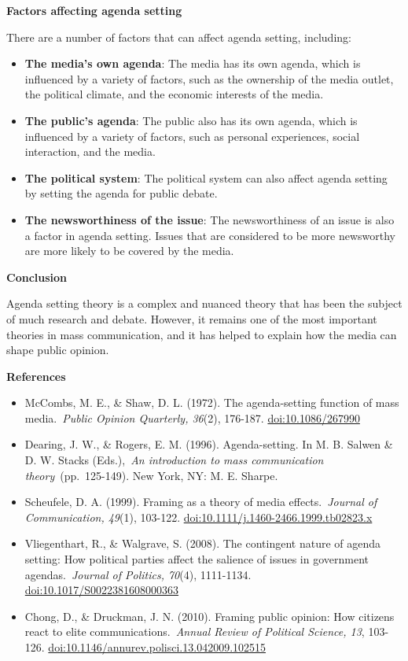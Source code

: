 \documentclass[
  b5paper]{book}
\begin{document}
\textbf{Factors affecting agenda setting}

There are a number of factors that can affect agenda setting, including:

\begin{itemize}
\item
  \textbf{The media's own agenda}: The media has its own agenda, which is influenced by a variety of factors, such as the ownership of the media outlet, the political climate, and the economic interests of the media.
\item
  \textbf{The public's agenda}: The public also has its own agenda, which is influenced by a variety of factors, such as personal experiences, social interaction, and the media.
\item
  \textbf{The political system}: The political system can also affect agenda setting by setting the agenda for public debate.
\item
  \textbf{The newsworthiness of the issue}: The newsworthiness of an issue is also a factor in agenda setting. Issues that are considered to be more newsworthy are more likely to be covered by the media.
\end{itemize}

\textbf{Conclusion}

Agenda setting theory is a complex and nuanced theory that has been the subject of much research and debate. However, it remains one of the most important theories in mass communication, and it has helped to explain how the media can shape public opinion.

\textbf{References}

\begin{itemize}
\item
  McCombs, M. E., \& Shaw, D. L. (1972). The agenda-setting function of mass media.~\emph{Public Opinion Quarterly, 36}(2), 176-187. \url{doi:10.1086/267990}
\item
  Dearing, J. W., \& Rogers, E. M. (1996). Agenda-setting. In M. B. Salwen \& D. W. Stacks (Eds.),~\emph{An introduction to mass communication theory}~(pp.~125-149). New York, NY: M. E. Sharpe.
\item
  Scheufele, D. A. (1999). Framing as a theory of media effects.~\emph{Journal of Communication, 49}(1), 103-122. \url{doi:10.1111/j.1460-2466.1999.tb02823.x}
\item
  Vliegenthart, R., \& Walgrave, S. (2008). The contingent nature of agenda setting: How political parties affect the salience of issues in government agendas.~\emph{Journal of Politics, 70}(4), 1111-1134. \url{doi:10.1017/S0022381608000363}
\item
  Chong, D., \& Druckman, J. N. (2010). Framing public opinion: How citizens react to elite communications.~\emph{Annual Review of Political Science, 13}, 103-126. \url{doi:10.1146/annurev.polisci.13.042009.102515}
\end{itemize}
\end{document}
